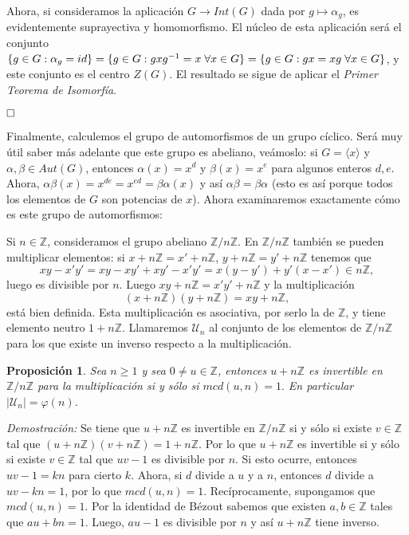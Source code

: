 \documentclass[12pt]{article}
\newtheorem{proposition}[theorem]{Proposición}
\begin{document}
Ahora, si consideramos la aplicación $G \longrightarrow Int(G)$ dada por $g \longmapsto \alpha_g$, es evidentemente suprayectiva y homomorfismo. El núcleo de esta aplicación será el conjunto $\lbrace g \in G : \alpha_g = id \rbrace = \lbrace g \in G: gxg^{-1}=x\hspace{0.1cm} \forall x \in G \rbrace = \lbrace g \in G : gx = xg\hspace{0.1cm} \forall x \in G \rbrace$, y este conjunto es el centro $Z(G)$. El resultado se sigue de aplicar el \textit{Primer Teorema de Isomorfía}. 

$\hfill \square$

Finalmente, calculemos el grupo de automorfismos de un grupo cíclico. Será muy útil saber más adelante que este grupo es abeliano, veámoslo: si $G = \langle x \rangle $ y $\alpha, \beta \in Aut(G)$, entonces $\alpha (x) = x^d$ y $\beta(x) = x^e$ para algunos enteros $d,e$. Ahora, $\alpha\beta(x)=x^{de} = x^{ed}=\beta \alpha (x)$ y así $\alpha \beta = \beta \alpha$ (esto es así porque todos los elementos de $G$ son potencias de $x$). Ahora examinaremos exactamente cómo es este grupo de automorfismos: 

Si $n \in \mathbb{Z}$, consideramos el grupo abeliano $\mathbb{Z}/n\mathbb{Z}$. En $\mathbb{Z}/n\mathbb{Z}$ también se pueden multiplicar elementos: si $x+n\mathbb{Z}=x'+n\mathbb{Z}$, $y +n\mathbb{Z}=y'+n\mathbb{Z}$ tenemos que $$xy-x'y' = xy-xy'+xy'-x'y'= x(y-y')+y'(x-x') \in n\mathbb{Z},$$ luego es divisible por $n$. Luego $xy + n\mathbb{Z} = x'y' +n\mathbb{Z}$ y la multiplicación $$(x+n\mathbb{Z})(y+n\mathbb{Z})=xy+n\mathbb{Z},$$ está bien definida. Esta multiplicación es asociativa, por serlo la de $\mathbb{Z}$, y tiene elemento neutro $1 + n\mathbb{Z}$. Llamaremos \textbf{$\mathcal{U}_n$} al conjunto de los elementos de $\mathbb{Z}/n\mathbb{Z}$ para los que existe un inverso respecto a la multiplicación.

\begin{proposition}Sea $n \geq 1$ y sea $0 \neq u \in \mathbb{Z}$, entonces $u + n\mathbb{Z}$ es invertible en $\mathbb{Z}/n\mathbb{Z}$ para la multiplicación si y sólo si $mcd(u,n)=1.$ En particular $|\mathcal{U}_n| = \varphi(n)$.
\end{proposition}
\emph{Demostración: }Se tiene que $u + n\mathbb{Z}$ es invertible en $\mathbb{Z}/n\mathbb{Z}$ si y sólo si existe $v \in \mathbb{Z}$ tal que $(u +n\mathbb{Z})(v+n\mathbb{Z})=1+n\mathbb{Z}$. Por lo que $u +n\mathbb{Z}$ es invertible si y sólo si existe $v \in \mathbb{Z}$ tal que $uv-1$ es divisible por $n$. Si esto ocurre, entonces $uv-1 = kn$ para cierto $k$. Ahora, si $d$ divide a $u$ y a $n$, entonces $d$ divide a $uv-kn = 1$, por lo que $mcd(u,n)=1$. Recíprocamente, supongamos que $mcd(u,n)=1$. Por la identidad de Bézout sabemos que existen $a,b \in \mathbb{Z}$ tales que $au+bn = 1$. Luego, $au-1$ es divisible por $n$ y así $u+n\mathbb{Z}$ tiene inverso.
\end{document}
